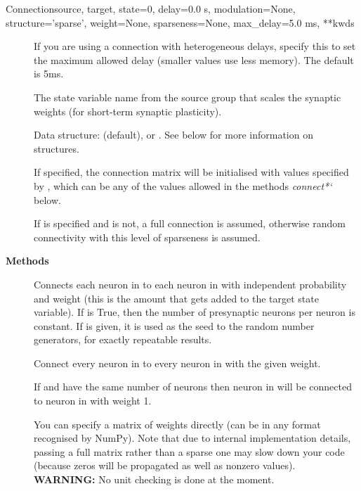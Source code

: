 \documentclass[letterpaper,10pt,english]{manual}
\begin{document}
\begin{classdesc}{Connection}{source, target, state=0, delay=0.0 s, modulation=None, structure='sparse', weight=None, sparseness=None, max\_delay=5.0 ms, **kwds}
\begin{description}
\item[]
If you are using a connection with heterogeneous delays, specify
this to set the maximum allowed delay (smaller values use less
memory). The default is 5ms.

\item[]
The state variable name from the source group that scales
the synaptic weights (for short-term synaptic plasticity).

\item[]
Data structure:  (default),  or
. See below for more information on structures.

\item[]
If specified, the connection matrix will be initialised with
values specified by , which can be any of the values
allowed in the methods \emph{connect*{}`} below.

\item[]
If  is specified and  is not, a full
connection is assumed, otherwise random connectivity with this
level of sparseness is assumed.

\end{description}

\textbf{Methods}
\begin{description}
\item[]
Connects each neuron in  to each neuron in  with independent
probability  and weight  (this is the amount that
gets added to the target state variable). If  is True, then
the number of presynaptic neurons per neuron is constant. If 
is given, it is used as the seed to the random number generators, for
exactly repeatable results.

\item[]
Connect every neuron in  to every neuron in  with the given
weight.

\item[]
If  and  have the same number of neurons then neuron 
in  will be connected to neuron  in  with weight 1.

\item[]
You can specify a matrix of weights directly (can be in any format
recognised by NumPy). Note that due to internal implementation details,
passing a full matrix rather than a sparse one may slow down your code
(because zeros will be propagated as well as nonzero values).
\textbf{WARNING:} No unit checking is done at the moment.


\end{description}
\end{classdesc}
\end{document}
